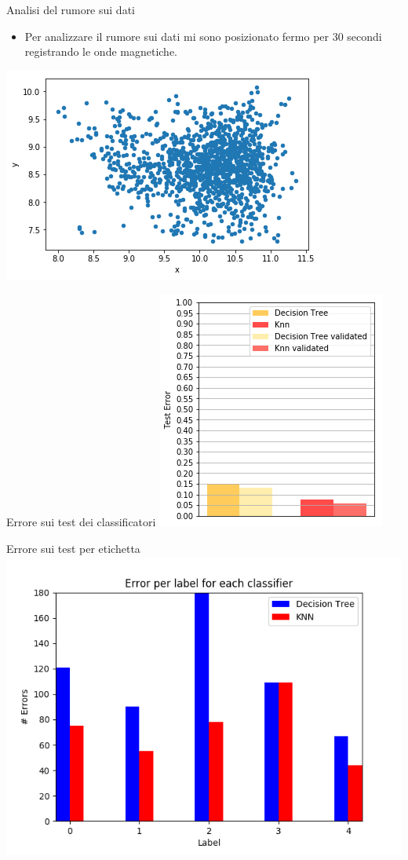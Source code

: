 \documentclass[11pt]{beamer}
\begin{document}
	\begin{frame}{Analisi del rumore sui dati}
		\begin{itemize}
			\item Per analizzare il rumore sui dati mi sono posizionato fermo per 30 secondi registrando le onde magnetiche.
		\end{itemize}
		\includegraphics[width=0.7\linewidth]{img/xystand}
	\end{frame}
	\begin{frame}{Errore sui test dei classificatori}
		\includegraphics[width=0.7\linewidth]{img/test_error_classifiers}
	\end{frame}
	\begin{frame}{Errore sui test per etichetta}
		\includegraphics[width=1\linewidth]{img/test_error_per_label}
	\end{frame}
\end{document}

